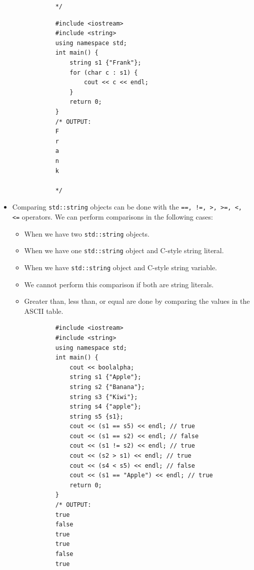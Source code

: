 \begin{itemize}
\begin{verbatim}
            */
        \end{verbatim}
        \begin{verbatim}
            #include <iostream>
            #include <string>
            using namespace std;
            int main() {
                string s1 {"Frank"};
                for (char c : s1) {
                    cout << c << endl;
                }
                return 0;
            }
            /* OUTPUT:
            F
            r
            a
            n
            k

            */
        \end{verbatim}
    
    \item Comparing \texttt{std::string} objects can be done with the \texttt{==, !=, >, >=, <, <=} operators. We can perform comparisons in the following cases: 
        \begin{itemize}
            \item When we have two \texttt{std::string} objects.
            \item When we have one \texttt{std::string} object and C-style string literal.
            \item When we have \texttt{std::string} object and C-style string variable.
            \item We cannot perform this comparison if both are string literals.
            \item Greater than, less than, or equal are done by comparing the values in the ASCII table.
        \end{itemize}
        \begin{verbatim}
            #include <iostream>
            #include <string>
            using namespace std;
            int main() {
                cout << boolalpha;
                string s1 {"Apple"};
                string s2 {"Banana"};
                string s3 {"Kiwi"};
                string s4 {"apple"};
                string s5 {s1};
                cout << (s1 == s5) << endl; // true
                cout << (s1 == s2) << endl; // false
                cout << (s1 != s2) << endl; // true
                cout << (s2 > s1) << endl; // true
                cout << (s4 < s5) << endl; // false
                cout << (s1 == "Apple") << endl; // true
                return 0;
            }
            /* OUTPUT:
            true
            false
            true
            true
            false
            true


\end{verbatim}
\end{itemize}
